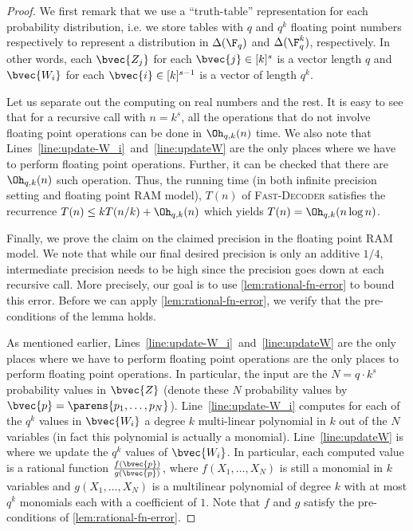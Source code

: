 \documentclass[11pt]{article}
\begin{document}
	\begin{proof}
	    We first remark that we use a ``truth-table'' representation for each probability distribution, i.e. we store tables with $q$ and $q^k$ floating point numbers respectively to represent a distribution in $\Delta(\F_q)$ and $\Delta(\F_q^k)$, respectively. In other words, each $\bvec{Z_j}$ for each $\bvec{j}\in [k]^s$ is a vector length $q$ and $\bvec{W_i}$  for each  $\bvec{i}\in [k]^{s-1}$ is a vector of length $q^k$.
	    
	    Let us separate out the computing on real numbers and the rest. It is easy to see that for a recursive call with $n=k^s$, all the operations that do not involve floating point operations can be done in $\Oh_{q,k}(n)$ time. We also note that Lines~\ref{line:update-W_i}~and~\ref{line:updateW} are the only places where we have to perform floating point operations. Further, it can be checked that there are $\Oh_{q,k}(n)$ such operation.
		Thus, the running time (in both infinite precision setting and floating point RAM model), $T(n)$ of \textsc{Fast-Decoder} satisfies the recurrence $T(n) \leq kT(n/k) + \Oh_{q,k}(n)$ which yields $T(n) = \Oh_{q,k}(n \log n)$.
		
		Finally, we prove the claim on the claimed precision in the floating point RAM model.
		We  note that while our final desired precision is only an additive $1/4$, intermediate precision needs to be high since the precision goes down at each recursive call. More precisely, our goal is to use \cref{lem:rational-fn-error} to bound this error. Before we can apply \cref{lem:rational-fn-error}, we verify that the pre-conditions of the lemma holds. 
		
		As mentioned earlier, Lines~\ref{line:update-W_i}~and~\ref{line:updateW} are the only places where we have to perform floating point operations are the only places to perform floating point operations. In particular, the input are the $N=q\cdot k^s$ probability values in $\bvec{Z}$ (denote these $N$ probability values by $\bvec{p}=\parens{p_1,\dots,p_N}$). Line~\ref{line:update-W_i} computes for each of the $q^k$ values in $\bvec{W_i}$  a degree $k$ multi-linear polynomial in $k$ out of the $N$ variables (in fact this polynomial is actually a monomial). Line~\ref{line:updateW} is where we update the $q^k$ values of $\bvec{W_i}$. In particular, each computed value is a rational function $\frac{f(\bvec{p})}{g(\bvec{p})}$, where $f(X_1,\dots,X_N)$ is still a monomial in $k$ variables and $g(X_1,\dots,X_N)$ is a multilinear polynomial of degree $k$ with at most $q^k$ monomials each with a coefficient of $1$. Note that $f$ and $g$ satisfy the pre-conditions of \cref{lem:rational-fn-error}.
		

\end{proof}
\end{document}
